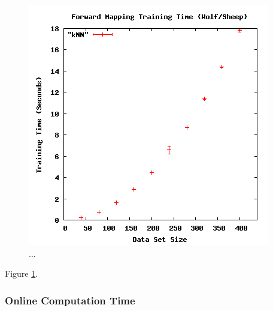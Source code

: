 \begin{figure}[ht]
\centering
\includegraphics[scale=.5]{images/results_wolfsheep/fm-training.png}
\caption{...}
\label{fig:wolfsheepfmtraining}
\end{figure}

Figure \ref{fig:wolfsheepfmtraining}.



  \subsubsection{Online Computation Time}

